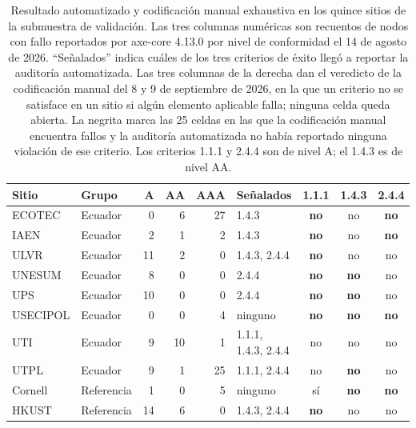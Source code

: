\documentclass[pdflatex,sn-basic,Numbered,iicol]{sn-jnl}
\theoremstyle{thmstyleone}
\theoremstyle{thmstyletwo}
\theoremstyle{thmstylethree}
\begin{document}
\begin{table}[htbp]
	\centering
	\caption{Resultado automatizado y codificaci\'on manual exhaustiva en los quince sitios de la submuestra de validaci\'on. Las tres columnas num\'ericas son recuentos de nodos con fallo reportados por axe-core 4.13.0 por nivel de conformidad el 14 de agosto de 2026. ``Se\~nalados'' indica cu\'ales de los tres criterios de \'exito lleg\'o a reportar la auditor\'ia automatizada. Las tres columnas de la derecha dan el veredicto de la codificaci\'on manual del 8 y 9 de septiembre de 2026, en la que un criterio no se satisface en un sitio si alg\'un elemento aplicable falla; ninguna celda queda abierta. La negrita marca las 25 celdas en las que la codificaci\'on manual encuentra fallos y la auditor\'ia automatizada no hab\'ia reportado ninguna violaci\'on de ese criterio. Los criterios 1.1.1 y 2.4.4 son de nivel A; el 1.4.3 es de nivel AA.}\label{tab:manual}
	\begin{tabular}{llrrrlccc}
		\toprule
		Sitio & Grupo & A & AA & AAA & Se\~nalados & 1.1.1 & 1.4.3 & 2.4.4 \\
		\midrule
		ECOTEC       & Ecuador &  0 &  6 & 27 & 1.4.3               & \textbf{no} & no          & \textbf{no} \\
		IAEN         & Ecuador &  2 &  1 &  2 & 1.4.3               & \textbf{no} & no          & \textbf{no} \\
		ULVR         & Ecuador & 11 &  2 &  0 & 1.4.3, 2.4.4        & \textbf{no} & no          & no          \\
		UNESUM       & Ecuador &  8 &  0 &  0 & 2.4.4               & \textbf{no} & \textbf{no} & no          \\
		UPS          & Ecuador & 10 &  0 &  0 & 2.4.4               & \textbf{no} & \textbf{no} & no          \\
		USECIPOL     & Ecuador &  0 &  0 &  4 & ninguno                & \textbf{no} & \textbf{no} & \textbf{no} \\
		UTI          & Ecuador &  9 & 10 &  1 & 1.1.1, 1.4.3, 2.4.4 & no          & no          & no          \\
		UTPL         & Ecuador &  9 &  1 & 25 & 1.1.1, 2.4.4        & no          & \textbf{no} & no          \\
		\midrule
		Cornell      & Referencia &  1 &  0 &  5 & ninguno                & s\'i         & \textbf{no} & \textbf{no} \\
		HKUST        & Referencia & 14 &  6 &  0 & 1.4.3, 2.4.4        & \textbf{no} & no          & no          \\

\end{tabular}
\end{table}
\end{document}
